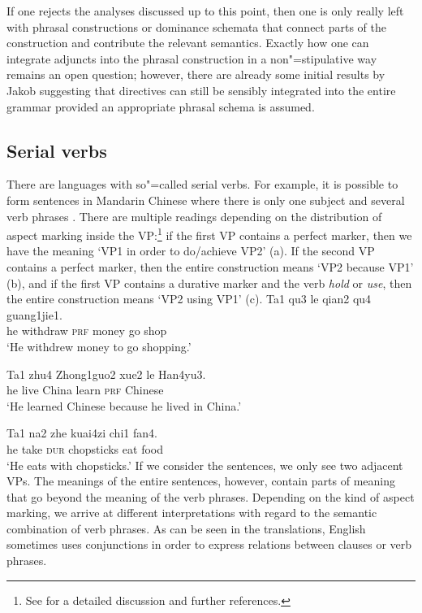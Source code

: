\begin{exe}
\begin{xlist}[iv.]
\begin{exe}
\begin{xlist}[iv.]
If one rejects the analyses discussed up to this point, then one is only really left with phrasal constructions or dominance schemata that connect parts
of the construction and contribute the relevant semantics. Exactly how one can integrate adjuncts into the phrasal construction in a non"=stipulative way
remains an open question; however, there are already some initial results by Jakob \citet{Mache2010a} suggesting that directives can still be sensibly integrated into
the entire grammar provided an appropriate phrasal schema is assumed.

\subsection{Serial verbs}

There are languages with so"=called serial verbs. For example, it is possible to form sentences in Mandarin Chinese where there is only one subject
and several verb phrases \citep[Chapter~21]{LT81a}. There are multiple readings depending on the
distribution of aspect marking inside the VP:\footnote{
  See  for a detailed discussion and further references.
} if the first VP contains a perfect marker, then we have
the meaning `VP1 in order to do/achieve VP2' (a). If the second VP contains a perfect marker, then the entire construction means `VP2 because VP1' (b), and if the
first VP contains a durative marker and the verb \emph{hold} or \emph{use}, then the entire construction means `VP2 using VP1' (c). 
\eal
\ex
\gll Ta1 qu3 le qian2 qu4 guang1jie1. \\
     he withdraw \textsc{prf} money go shop \\
\glt `He withdrew money to go shopping.'

\ex
\gll Ta1 zhu4 Zhong1guo2 xue2 le Han4yu3. \\
     he  live China learn \textsc{prf} Chinese \\
\glt `He learned Chinese because he lived in China.'

\ex
\gll Ta1 na2 zhe kuai4zi chi1 fan4.\\
     he  take \textsc{dur} chopsticks eat food \\
\glt `He eats with chopsticks.'
\zl
If we consider the sentences, we only see two adjacent VPs. The meanings of the entire sentences, however, contain parts of meaning that go beyond the meaning
of the verb phrases. Depending on the kind of aspect marking, we arrive at different interpretations with regard to the semantic combination of verb phrases.
As can be seen in the translations, English sometimes uses conjunctions in order to express relations between clauses or verb phrases.


\end{xlist}
\end{exe}
\end{xlist}
\end{exe}
